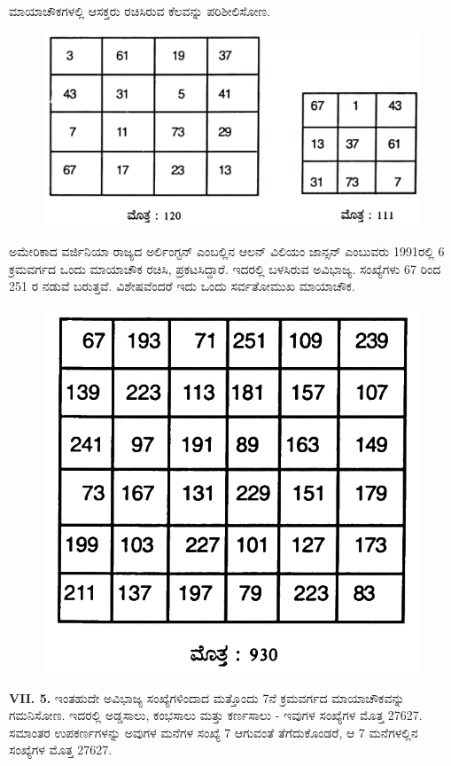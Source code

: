 ಮಾಯಾಚೌಕಗಳಲ್ಲಿ ಆಸಕ್ತರು ರಚಿಸಿರುವ ಕೆಲವನ್ನು ಪರಿಶೀಲಿಸೋಣ.
\begin{figure}[H]
\includegraphics{src/figures/chap5/fig5-4.jpg}
\end{figure}

ಅಮೇರಿಕಾದ ವರ್ಜಿನಿಯಾ ರಾಜ್ಯದ ಅರ್ಲಿಂಗ್ಟನ್ ಎಂಬಲ್ಲಿನ ಆಲನ್ ವಿಲಿಯಂ \hbox{ಜಾನ್ಸನ್} ಎಂಬುವರು 1991ರಲ್ಲಿ 6 ಕ್ರಮವರ್ಗದ ಒಂದು ಮಾಯಾಚೌಕ ರಚಿಸಿ, ಪ್ರಕಟಸಿದ್ದಾರೆ. ಇದರಲ್ಲಿ ಬಳಸಿರುವ ಅವಿಭಾಜ್ಯ. ಸಂಖ್ಯೆಗಳು 67 ರಿಂದ 251 ರ ನಡುವೆ ಬರುತ್ತವೆ. ವಿಶೇಷವೆಂದರೆ ಇದು ಒಂದು ಸರ್ವತೋಮುಖ ಮಾಯಾಚೌಕ.
\begin{figure}[H]
\includegraphics{src/figures/chap5/fig5-5.jpg}
\end{figure}

\textbf{VII. 5.} ಇಂತಹುದೇ ಅವಿಭಾಜ್ಯ ಸಂಖ್ಯೆಗಳಿಂದಾದ ಮತ್ತೊಂದು 7ನೆ ಕ್ರಮವರ್ಗದ ಮಾಯಾಚೌಕವನ್ನು ಗಮನಿಸೋಣ. ಇದರಲ್ಲಿ ಅಡ್ಡಸಾಲು, ಕಂಭಸಾಲು ಮತ್ತು ಕರ್ಣಸಾಲು - ಇವುಗಳ ಸಂಖ್ಯೆಗಳ ಮೊತ್ತ 27627. ಸಮಾಂತರ ಉಪಕರ್ಣಗಳನ್ನು ಅವುಗಳ ಮನೆಗಳ ಸಂಖ್ಯೆ 7 ಆಗುವಂತೆ ತೆಗೆದುಕೊಂಡರೆ, ಆ 7 ಮನೆಗಳಲ್ಲಿನ ಸಂಖ್ಯೆಗಳ ಮೊತ್ತ 27627.

